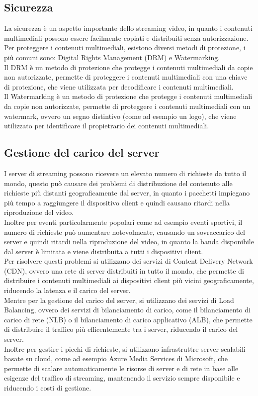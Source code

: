 \subsection{Sicurezza}
La sicurezza è un aspetto importante dello streaming video, in quanto i contenuti multimediali possono essere facilmente copiati e distribuiti senza autorizzazione.
Per proteggere i contenuti multimediali, esistono diversi metodi di protezione, i più comuni sono: Digital Rights Management (DRM) e Watermarking.\\
Il DRM è un metodo di protezione che protegge i contenuti multimediali da copie non autorizzate, permette di proteggere i contenuti multimediali con una chiave di protezione,
che viene utilizzata per decodificare i contenuti multimediali.\\
Il Watermarking è un metodo di protezione che protegge i contenuti multimediali da copie non autorizzate, permette di proteggere i contenuti multimediali con un watermark, ovvero un segno distintivo (come ad esempio un logo), 
che viene utilizzato per identificare il propietrario dei contenuti multimediali.\\

\subsection{Gestione del carico del server}
I server di streaming possono ricevere un elevato numero di richieste da tutto il mondo, questo può causare dei problemi di distribuzione del contenuto 
alle richieste più distanti geograficamente dal server, in quanto i pacchetti impiegano più tempo a raggiungere il dispositivo client e quindi causano ritardi nella riproduzione del video.\\
Inoltre per eventi particolarmente popolari come ad esempio eventi sportivi, il numero di richieste può aumentare notevolmente, causando un sovraccarico del server e quindi ritardi nella riproduzione
del video, in quanto la banda disponibile dal server è limitata e viene distribuita a tutti i dispositivi client.\\
Per risolvere questi problemi si utilizzano dei servizi di Content Delivery Network (CDN), ovvero una rete di server distribuiti in tutto il mondo, che permette di distribuire i contenuti multimediali
ai dispositivi client più vicini geograficamente, riducendo la latenza e il carico del server.\\
Mentre per la gestione del carico del server, si utilizzano dei servizi di Load Balancing, ovvero dei servizi di bilanciamento di carico, come il bilanciamento di carico di rete (NLB) o il 
bilanciamento di carico applicativo (ALB), che permette di distribuire il traffico più efficentemente tra i server, riducendo il carico del server.\\
Inoltre per gestire i picchi di richieste, si utilizzano infrastruttre server scalabili basate su cloud, come ad esempio Azure Media Services di Microsoft, che permette di scalare automaticamente le risorse di
server e di rete in base alle esigenze del traffico di streaming, mantenendo il servizio sempre disponibile e riducendo i costi di gestione.\\

